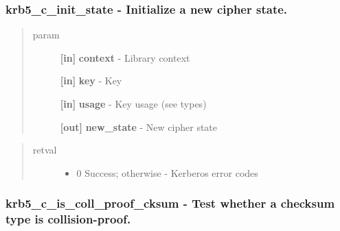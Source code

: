\documentclass[letterpaper,10pt,english]{sphinxmanual}
\begin{document}
\subsubsection{krb5\_c\_init\_state -  Initialize a new cipher state.}
\label{appdev/refs/api/krb5_c_init_state:krb5-c-init-state-initialize-a-new-cipher-state}\label{appdev/refs/api/krb5_c_init_state::doc}

\begin{fulllineitems}
\label{appdev/refs/api/krb5_c_init_state:c.krb5_c_init_state}
\end{fulllineitems}

\begin{quote}\begin{description}
\item[{param}] \leavevmode
\textbf{{[}in{]}} \textbf{context} - Library context

\textbf{{[}in{]}} \textbf{key} - Key

\textbf{{[}in{]}} \textbf{usage} - Key usage (see  types)

\textbf{{[}out{]}} \textbf{new\_state} - New cipher state

\end{description}\end{quote}
\begin{quote}\begin{description}
\item[{retval}] \leavevmode\begin{itemize}
\item {} 
0   Success; otherwise - Kerberos error codes

\end{itemize}

\end{description}\end{quote}


\subsubsection{krb5\_c\_is\_coll\_proof\_cksum -  Test whether a checksum type is collision-proof.}
\label{appdev/refs/api/krb5_c_is_coll_proof_cksum:krb5-c-is-coll-proof-cksum-test-whether-a-checksum-type-is-collision-proof}\label{appdev/refs/api/krb5_c_is_coll_proof_cksum::doc}
\end{document}
